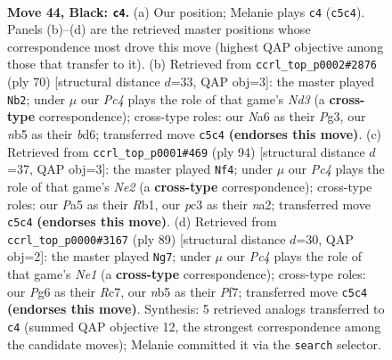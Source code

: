 \documentclass[11pt]{article}
\begin{document}
\clearpage

\begin{figure}[p]\centering
\begin{subfigure}{0.46\textwidth}\centering
\resizebox{\linewidth}{!}{%
\newchessgame
\chessboard[
  setfen={8/1p2pk1p/n5p1/pNp5/7r/2P2P2/P2R1K2/B7 b - - 1 44},
  showmover=false,
  pgfstyle=straightmove, color=movearrow, markmove={c5-c4}
]}
\caption{}
\end{subfigure}\hfill
\begin{subfigure}{0.46\textwidth}\centering
\resizebox{\linewidth}{!}{%
\newchessgame
\chessboard[
  setfen={2r3k1/5p1p/1p1b2p1/3Pp3/R7/3NP1PP/5PK1/8 w - - 2 36},
  showmover=false,
  pgfstyle=straightmove, color=movearrow, markmove={d3-b2}
]}
\caption{}
\end{subfigure}
\\[4pt]
\begin{subfigure}{0.46\textwidth}\centering
\resizebox{\linewidth}{!}{%
\newchessgame
\chessboard[
  setfen={2r3k1/7p/5p2/3p1P2/1p1P4/6P1/n3N1KP/1R6 w - - 2 48},
  showmover=false,
  pgfstyle=straightmove, color=movearrow, markmove={e2-f4}
]}
\caption{}
\end{subfigure}\hfill
\begin{subfigure}{0.46\textwidth}\centering
\resizebox{\linewidth}{!}{%
\newchessgame
\chessboard[
  setfen={4nk2/p1r2p2/1p4p1/6Pp/8/1N4PP/PP1R2K1/8 b - - 2 45},
  showmover=false,
  pgfstyle=straightmove, color=movearrow, markmove={e8-g7}
]}
\caption{}
\end{subfigure}
\caption{\textbf{Move 44, Black: \texttt{c4}.} (a) Our position; Melanie plays \texttt{c4} (\texttt{c5c4}). Panels (b)--(d) are the retrieved master positions whose correspondence most drove this move (highest QAP objective among those that transfer to it). (b) Retrieved from \texttt{ccrl\_top\_p0002\#2876} (ply 70) [structural distance $d$=33, QAP obj=3]: the master played \texttt{Nb2}; under $\mu$ our \emph{Pc4} plays the role of that game's \emph{Nd3} (a \textbf{cross-type} correspondence); cross-type roles: our \emph{N}a6 as their \emph{P}g3, our \emph{n}b5 as their \emph{b}d6; transferred move \texttt{c5c4} \textbf{(endorses this move)}. (c) Retrieved from \texttt{ccrl\_top\_p0001\#469} (ply 94) [structural distance $d$=37, QAP obj=3]: the master played \texttt{Nf4}; under $\mu$ our \emph{Pc4} plays the role of that game's \emph{Ne2} (a \textbf{cross-type} correspondence); cross-type roles: our \emph{P}a5 as their \emph{R}b1, our \emph{p}c3 as their \emph{n}a2; transferred move \texttt{c5c4} \textbf{(endorses this move)}. (d) Retrieved from \texttt{ccrl\_top\_p0000\#3167} (ply 89) [structural distance $d$=30, QAP obj=2]: the master played \texttt{Ng7}; under $\mu$ our \emph{Pc4} plays the role of that game's \emph{Ne1} (a \textbf{cross-type} correspondence); cross-type roles: our \emph{P}g6 as their \emph{R}c7, our \emph{n}b5 as their \emph{P}f7; transferred move \texttt{c5c4} \textbf{(endorses this move)}. Synthesis: 5 retrieved analogs transferred to \texttt{c4} (summed QAP objective 12, the strongest correspondence among the candidate moves); Melanie committed it via the \texttt{search} selector.}
\label{fig:thought-m87}
\end{figure}
\end{document}
